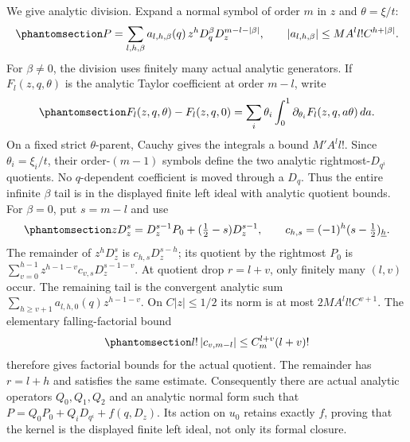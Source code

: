 \documentclass[
  english,
  11pt,
  reqno]{amsart}
\begin{document}
We give analytic division. Expand a normal symbol of order \(m\) in
\(z\) and \(\theta=\xi/t\):
\begin{equation}\protect\phantomsection\label{eq:gg-module-symbol-taylor}{
 P=\sum_{l,h,\beta}
 a_{l,h,\beta}(q)\,z^hD_q^\beta D_z^{m-l-|\beta|},
 \qquad
 |a_{l,h,\beta}|\le MA^l l!C^{h+|\beta|}.
}\end{equation} For \(\beta\ne0\), the division uses finitely many
actual analytic generators. If \(F_l(z,q,\theta)\) is the analytic
Taylor coefficient at order \(m-l\), write
\begin{equation}\protect\phantomsection\label{eq:gg-module-finite-taylor-division}{
 F_l(z,q,\theta)-F_l(z,q,0)
 =\sum_i\theta_i\int_0^1
           \partial_{\theta_i}F_l(z,q,a\theta)\,da .
}\end{equation} On a fixed strict \(\theta\)-parent, Cauchy gives the
integrals a bound \(M'A^l l!\). Since \(\theta_i=\xi_i/t\), their
order-\((m-1)\) symbols define the two analytic rightmost-\(D_{q^i}\)
quotients. No \(q\)-dependent coefficient is moved through a \(D_q\).
Thus the entire infinite \(\beta\) tail is in the displayed finite left
ideal with analytic quotient bounds. For \(\beta=0\), put \(s=m-l\) and
use
\begin{equation}\protect\phantomsection\label{eq:gg-module-ore-division}{
 zD_z^s=D_z^{s-1}P_0+(\tfrac12-s)D_z^{s-1},\qquad
 c_{h,s}=(-1)^h(s-\tfrac12)_{\underline h}.
}\end{equation} The remainder of \(z^hD_z^s\) is \(c_{h,s}D_z^{s-h}\);
its quotient by the rightmost \(P_0\) is
\(\sum_{v=0}^{h-1}z^{h-1-v}c_{v,s}D_z^{s-1-v}\). At quotient drop
\(r=l+v\), only finitely many \((l,v)\) occur. The remaining tail is the
convergent analytic sum \(\sum_{h\ge v+1}a_{l,h,0}(q)z^{h-1-v}\). On
\(C|z|\le1/2\) its norm is at most \(2MA^l l!C^{v+1}\). The elementary
falling-factorial bound
\begin{equation}\protect\phantomsection\label{eq:gg-module-division-bound}{
 l!\,|c_{v,m-l}|\le C_m^{l+v}(l+v)!
}\end{equation} therefore gives factorial bounds for the actual
quotient. The remainder has \(r=l+h\) and satisfies the same estimate.
Consequently there are actual analytic operators \(Q_0,Q_1,Q_2\) and an
analytic normal form such that \(P=Q_0P_0+Q_iD_{q^i}+f(q,D_z)\). Its
action on \(u_0\) retains exactly \(f\), proving that the kernel is the
displayed finite left ideal, not only its formal closure.
\end{document}
